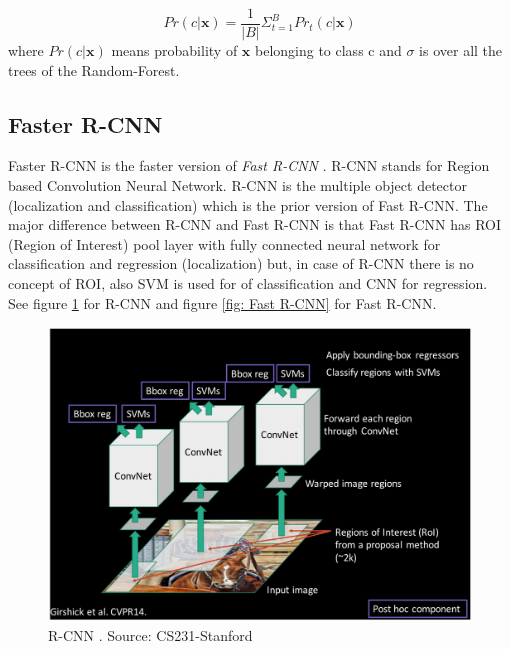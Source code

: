 \documentclass[twoside]{iitbreport}
\begin{document}
\begin{equation}\label{eq: random-forest_avg_eq}
        Pr(c|\boldsymbol{x}) = \frac{1}{|B|} \Sigma^{B}_{t=1} Pr_t(c|\boldsymbol{x})
\end{equation}
where $Pr(c|\boldsymbol{x})$ means probability of $\boldsymbol{x}$  belonging to class c and $\sigma$ is over all the trees of the Random-Forest.

\subsection{Faster R-CNN}
Faster R-CNN \cite{ren2015faster} is the  faster version of \textit{Fast R-CNN} \cite{girshick2015fast}. R-CNN stands for Region based Convolution Neural Network. R-CNN is the multiple object detector (localization and classification) which is the prior version of Fast R-CNN. The major difference between R-CNN \cite{girshick2014richrcnn} and Fast R-CNN \cite{girshick2015fast} is that Fast R-CNN has ROI (Region of Interest) pool layer with fully connected neural network for classification and regression (localization) but, in case of R-CNN  there is no concept of ROI, also SVM is used for of classification and CNN for regression.  See figure \ref{fig: R-CNN} for R-CNN and figure \ref{fig: Fast R-CNN} for Fast R-CNN.


\begin{figure}[H]
\includegraphics[width=0.85\linewidth]{R-CNN.png}
\centering
\captionsetup{justification=centering}
\caption{R-CNN \cite{girshick2014richrcnn} . Source: CS231-Stanford\protect\footnotemark}
\label{fig: R-CNN}
\end{figure}
\end{document}
